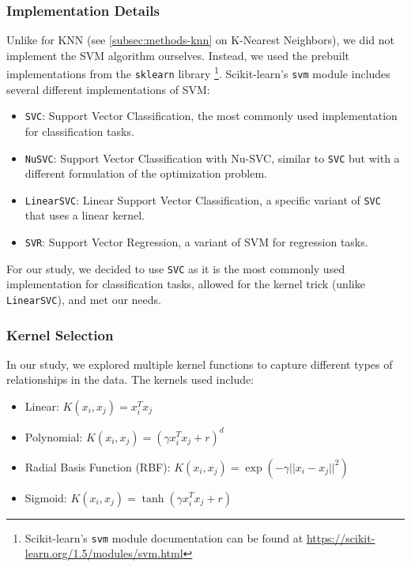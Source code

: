 \subsubsection{Implementation Details}

Unlike for KNN (see \autoref{subsec:methods-knn} on K-Nearest Neighbors), we did not implement the SVM algorithm ourselves.
Instead, we used the prebuilt implementations from the \texttt{sklearn} library
\footnote{Scikit-learn's \texttt{svm} module documentation can be found at \url{https://scikit-learn.org/1.5/modules/svm.html}}.
Scikit-learn's \texttt{svm} module includes several different implementations of SVM:

\begin{itemize}
    \item \texttt{SVC}: Support Vector Classification, the most commonly used implementation for classification tasks.
    \item \texttt{NuSVC}: Support Vector Classification with Nu-SVC, similar to \texttt{SVC} but with a different formulation of the optimization problem.
    \item \texttt{LinearSVC}: Linear Support Vector Classification, a specific variant of \texttt{SVC} that uses a linear kernel.
    \item \texttt{SVR}: Support Vector Regression, a variant of SVM for regression tasks.
\end{itemize}

For our study, we decided to use \texttt{SVC} as it is the most commonly used implementation
for classification tasks, allowed for the kernel trick (unlike \texttt{LinearSVC}), and met our needs.

\subsubsection{Kernel Selection}

In our study, we explored multiple kernel functions to capture different types of relationships in the data. The kernels used include:

\begin{itemize}
    \item Linear: $K(x_i, x_j) = x_i^T x_j$
    \item Polynomial: $K(x_i, x_j) = (\gamma x_i^T x_j + r)^d$
    \item Radial Basis Function (RBF): $K(x_i, x_j) = \exp(-\gamma ||x_i - x_j||^2)$
    \item Sigmoid: $K(x_i, x_j) = \tanh(\gamma x_i^T x_j + r)$
\end{itemize}

